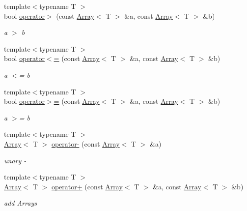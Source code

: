 \begin{DoxyCompactItemize}
{\footnotesize template$<$typename T $>$ }\\bool \mbox{\hyperlink{namespaceXMLArray_ad9684cbf7b3089e446a523042d2818c1}{operator$>$}} (const \mbox{\hyperlink{classXMLArray_1_1Array}{Array}}$<$ T $>$ \&a, const \mbox{\hyperlink{classXMLArray_1_1Array}{Array}}$<$ T $>$ \&b)
\begin{DoxyCompactList}\small\item\em a $>$ b \end{DoxyCompactList}\item 
{\footnotesize template$<$typename T $>$ }\\bool \mbox{\hyperlink{namespaceXMLArray_a874058edffc8dde49083322f99229c95}{operator$<$=}} (const \mbox{\hyperlink{classXMLArray_1_1Array}{Array}}$<$ T $>$ \&a, const \mbox{\hyperlink{classXMLArray_1_1Array}{Array}}$<$ T $>$ \&b)
\begin{DoxyCompactList}\small\item\em a $<$= b \end{DoxyCompactList}\item 
{\footnotesize template$<$typename T $>$ }\\bool \mbox{\hyperlink{namespaceXMLArray_a77b282c1c52b2e07215ed808a0646e10}{operator$>$=}} (const \mbox{\hyperlink{classXMLArray_1_1Array}{Array}}$<$ T $>$ \&a, const \mbox{\hyperlink{classXMLArray_1_1Array}{Array}}$<$ T $>$ \&b)
\begin{DoxyCompactList}\small\item\em a $>$= b \end{DoxyCompactList}\item 
{\footnotesize template$<$typename T $>$ }\\\mbox{\hyperlink{classXMLArray_1_1Array}{Array}}$<$ T $>$ \mbox{\hyperlink{namespaceXMLArray_a1d51bbb3ee59a78dd9e705ecd3db1571}{operator-\/}} (const \mbox{\hyperlink{classXMLArray_1_1Array}{Array}}$<$ T $>$ \&a)
\begin{DoxyCompactList}\small\item\em unary -\/ \end{DoxyCompactList}\item 
{\footnotesize template$<$typename T $>$ }\\\mbox{\hyperlink{classXMLArray_1_1Array}{Array}}$<$ T $>$ \mbox{\hyperlink{namespaceXMLArray_aaa831f7e352068ed72289b0dd0b9ec4d}{operator+}} (const \mbox{\hyperlink{classXMLArray_1_1Array}{Array}}$<$ T $>$ \&a, const \mbox{\hyperlink{classXMLArray_1_1Array}{Array}}$<$ T $>$ \&b)
\begin{DoxyCompactList}\small\item\em add Arrays \end{DoxyCompactList}\item 

\end{DoxyCompactItemize}
